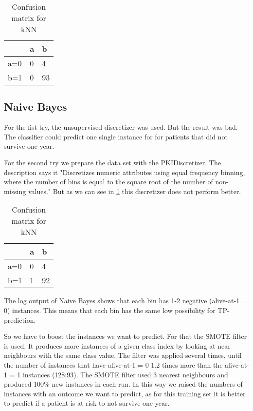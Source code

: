 \documentclass[paper=a4, fontsize=11pt]{scrartcl} %
\numberwithin{equation}{section} %
\numberwithin{figure}{section} %
\numberwithin{table}{section} %
\begin{document}
\vspace{6pt}

\begin{table}[h]
\centering
\begin{tabular}{|l|ll|}
\hline
 & a &	b \\
\hline
a=0 & 0 & 4 \\
b=1 & 0 & 93\\
\hline
\end{tabular}
\caption{Confusion matrix for kNN}
\end{table}


\subsection{Naive Bayes}

For the fist try, the unsupervised discretizer was used. But the result was bad. The classifier could predict one single instance for for patients that did not survive one year.

For the second try we prepare the data set with the PKIDiscretizer. The description says it "Discretizes numeric attributes using equal frequency binning, where the number of bins is equal to the square root of the number of non-missing values." But as we can see in \ref{tab:echo:bayes:1c} this discretizer does not perform better.

\begin{table}[h]
\centering
\begin{tabular}{|l|ll|}
\hline
 & a &	b \\
\hline
a=0 & 0 & 4 \\
b=1 & 1 & 92\\
\hline
\end{tabular}
\caption{Confusion matrix for kNN}
\label{tab:echo:bayes:1c}
\end{table}

The log output of Naive Bayes shows that each bin has 1-2 negative (alive-at-1 = 0) instances. This means that each bin has the same low possibility for TP-prediction.

So we have to boost the instances we want to predict. For that the SMOTE filter is used. It produces more instances of a given class index by looking at near neighbours with the same class value. The filter was applied several times, until the number of instances that have alive-at-1 = 0 1.2 times more than the alive-at-1 = 1 instances (128:93). The SMOTE filter used 3 nearest neighbours and produced 100\% new instances in each run. In this way we raised the numbers of instances with an outcome we want to predict, as for this training set it is better to predict if a patient is at risk to not survive one year.
\end{document}
